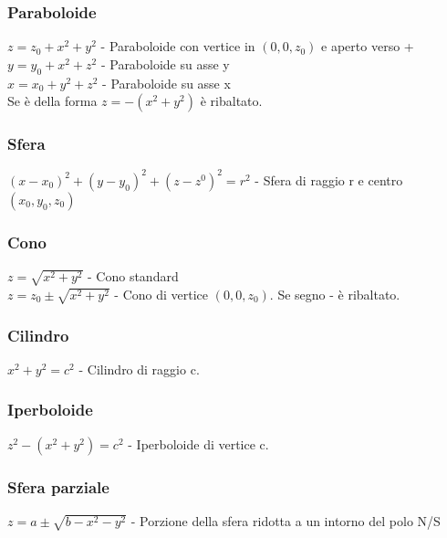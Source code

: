 \documentclass{article} %
\begin{document}
    \subsubsection*{Paraboloide}
    $z = z_0 + x^2 + y^2$ - Paraboloide con vertice in $(0,0,z_0)$ e aperto verso + \\
    $y = y_0 + x^2 + z^2$ - Paraboloide su asse y \\
    $x = x_0 + y^2 + z^2$ - Paraboloide su asse x \\
    Se è della forma $z=-(x^2 + y^2)$ è ribaltato.
    \subsubsection*{Sfera}
    $(x-x_0)^2+(y-y_0)^2+(z-z^0)^2=r^2$ - Sfera di raggio r e centro $(x_0,y_0,z_0)$
    \subsubsection*{Cono}
    $z = \sqrt{x^2+y^2}$ - Cono standard \\
    $z = z_0 \pm \sqrt{x^2+y^2}$ - Cono di vertice $(0,0,z_0)$. Se segno - è ribaltato.
    \subsubsection*{Cilindro}
    $x^2+y^2=c^2$ - Cilindro di raggio c.
    \subsubsection*{Iperboloide}
    $z^2-(x^2+y^2)=c^2$ - Iperboloide di vertice c.
    \subsubsection*{Sfera parziale}
    $z= a \pm \sqrt{b-x^2-y^2}$ - Porzione della sfera ridotta a un intorno del polo N/S
\end{document}
